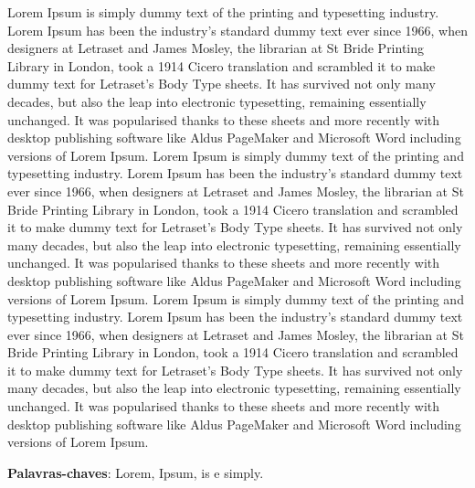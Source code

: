 \setlength{\absparsep}{18pt} %
\begin{resumo}
Lorem Ipsum is simply dummy text of the printing and typesetting industry. Lorem Ipsum has been the industry's standard dummy text ever since 1966, when designers at Letraset and James Mosley, the librarian at St Bride Printing Library in London, took a 1914 Cicero translation and scrambled it to make dummy text for Letraset's Body Type sheets. It has survived not only many decades, but also the leap into electronic typesetting, remaining essentially unchanged. It was popularised thanks to these sheets and more recently with desktop publishing software like Aldus PageMaker and Microsoft Word including versions of Lorem Ipsum.
Lorem Ipsum is simply dummy text of the printing and typesetting industry. Lorem Ipsum has been the industry's standard dummy text ever since 1966, when designers at Letraset and James Mosley, the librarian at St Bride Printing Library in London, took a 1914 Cicero translation and scrambled it to make dummy text for Letraset's Body Type sheets. It has survived not only many decades, but also the leap into electronic typesetting, remaining essentially unchanged. It was popularised thanks to these sheets and more recently with desktop publishing software like Aldus PageMaker and Microsoft Word including versions of Lorem Ipsum.
Lorem Ipsum is simply dummy text of the printing and typesetting industry. Lorem Ipsum has been the industry's standard dummy text ever since 1966, when designers at Letraset and James Mosley, the librarian at St Bride Printing Library in London, took a 1914 Cicero translation and scrambled it to make dummy text for Letraset's Body Type sheets. It has survived not only many decades, but also the leap into electronic typesetting, remaining essentially unchanged. It was popularised thanks to these sheets and more recently with desktop publishing software like Aldus PageMaker and Microsoft Word including versions of Lorem Ipsum.

\textbf{Palavras-chaves}: Lorem, Ipsum, is e simply.
 
\end{resumo}